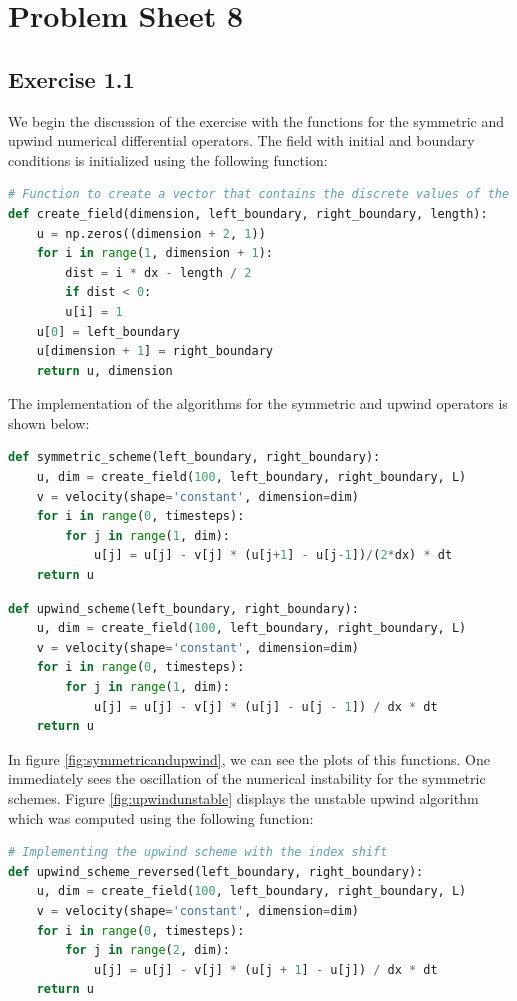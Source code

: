 \documentclass{scrartcl}
\begin{document}
\section*{Problem Sheet 8}
\subsection*{Exercise 1.1}
We begin the discussion of the exercise with the functions for the symmetric and upwind numerical differential operators. The field with initial and boundary conditions is initialized using the following function:
\begin{lstlisting}[title=Function to initialize boundary and initial conditions on the field.,  language=Python, frame=single]
# Function to create a vector that contains the discrete values of the field
def create_field(dimension, left_boundary, right_boundary, length):
	u = np.zeros((dimension + 2, 1))
	for i in range(1, dimension + 1):
		dist = i * dx - length / 2
		if dist < 0:
		u[i] = 1
	u[0] = left_boundary
	u[dimension + 1] = right_boundary
	return u, dimension
\end{lstlisting}
The implementation of the algorithms for the symmetric and upwind operators is shown below:
\begin{lstlisting}[title=Symmetric numerical derivative code.,  language=Python, frame=single]
def symmetric_scheme(left_boundary, right_boundary):
	u, dim = create_field(100, left_boundary, right_boundary, L)
	v = velocity(shape='constant', dimension=dim)
	for i in range(0, timesteps):
		for j in range(1, dim):
			u[j] = u[j] - v[j] * (u[j+1] - u[j-1])/(2*dx) * dt
	return u
\end{lstlisting}
\begin{lstlisting}[title=Upwind numerical derivative code.,  language=Python, frame=single]
def upwind_scheme(left_boundary, right_boundary):
	u, dim = create_field(100, left_boundary, right_boundary, L)
	v = velocity(shape='constant', dimension=dim)
	for i in range(0, timesteps):
		for j in range(1, dim):
			u[j] = u[j] - v[j] * (u[j] - u[j - 1]) / dx * dt
	return u
\end{lstlisting}
In figure \ref{fig:symmetricandupwind}, we can see the plots of this functions. One immediately sees the oscillation of the numerical instability for the symmetric schemes.
Figure \ref{fig:upwindunstable} displays the unstable upwind algorithm which was computed using the following function:
\begin{lstlisting}[title=Upwind numerical derivative code with shifted indices. This will lead to numerical instabilities.,  language=Python, frame=single]
# Implementing the upwind scheme with the index shift
def upwind_scheme_reversed(left_boundary, right_boundary):
	u, dim = create_field(100, left_boundary, right_boundary, L)
	v = velocity(shape='constant', dimension=dim)
	for i in range(0, timesteps):
		for j in range(2, dim):
			u[j] = u[j] - v[j] * (u[j + 1] - u[j]) / dx * dt
	return u
\end{lstlisting}
\end{document}
